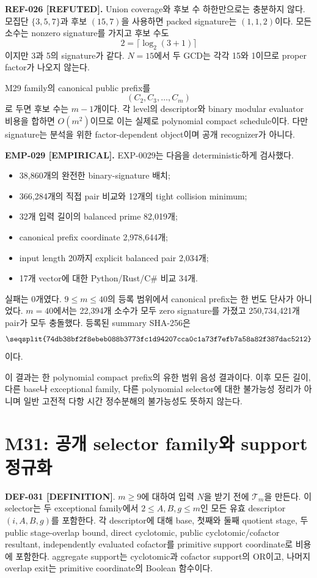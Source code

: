 \documentclass[11pt]{article}
\newcommand{\claimstatus}[2]{\textbf{#1 [#2]}}
\begin{document}
\textbf{REF-026 [REFUTED].}
Union coverage와 후보 수 하한만으로는 충분하지 않다. 모집단
\(\{3,5,7\}\)과 후보 \((15,7)\)을 사용하면 packed signature는
\((1,1,2)\)이다. 모든 소수는 nonzero signature를 가지고 후보 수도
\[
2=\lceil\log_2(3+1)\rceil
\]
이지만 3과 5의 signature가 같다. \(N=15\)에서 두 GCD는 각각 15와
1이므로 proper factor가 나오지 않는다.

M29 family의 canonical public prefix를
\[
(C_2,C_3,\ldots,C_m)
\]
로 두면 후보 수는 \(m-1\)개이다. 각 level의 descriptor와 binary
modular evaluator 비용을 합하면 \(O(m^2)\)이므로 이는 실제로
polynomial compact schedule이다. 다만 signature는 분석을 위한
factor-dependent object이며 공개 recognizer가 아니다.

\textbf{EMP-029 [EMPIRICAL].}
EXP-0029는 다음을 deterministic하게 검사했다.

\begin{itemize}
\item 38,860개의 완전한 binary-signature 배치;
\item 366,284개의 직접 pair 비교와 12개의 tight collision minimum;
\item 32개 입력 길이의 balanced prime 82,019개;
\item canonical prefix coordinate 2,978,644개;
\item input length 20까지 explicit balanced pair 2,034개;
\item 17개 vector에 대한 Python/Rust/C\# 비교 34개.
\end{itemize}

실패는 0개였다. \(9\le m\le40\)의 등록 범위에서 canonical prefix는
한 번도 단사가 아니었다. \(m=40\)에서는 22,394개 소수가 모두 zero
signature를 가졌고 250,734,421개 pair가 모두 충돌했다. 등록된
summary SHA-256은
\[
\texttt{\seqsplit{74db38bf2f8ebeb088b3773fc1d94207cca0c1a73f7efb7a58a82f387dac5212}}
\]
이다.

이 결과는 한 polynomial compact prefix의 유한 범위 음성 결과이다.
이후 모든 길이, 다른 base나 exceptional family, 다른 polynomial
selector에 대한 불가능성 정리가 아니며 일반 고전적 다항 시간
정수분해의 불가능성도 뜻하지 않는다.

\section{M31: 공개 selector family와 support 정규화}

\claimstatus{DEF-031}{DEFINITION}.
\(m\ge9\)에 대하여 입력 \(N\)을 받기 전에
\(\mathcal T_m\)을 만든다. 이 selector는 두 exceptional family에서
\(2\le A,B,g\le m\)인 모든 유효 descriptor \((i,A,B,g)\)를 포함한다.
각 descriptor에 대해 base, 첫째와 둘째 quotient stage, 두 public
stage-overlap bound, direct cyclotomic, public cyclotomic/cofactor
resultant, independently evaluated cofactor를 primitive support
coordinate로 비용에 포함한다. aggregate support는 cyclotomic과
cofactor support의 OR이고, 나머지 overlap exit는 primitive
coordinate의 Boolean 함수이다.
\end{document}
